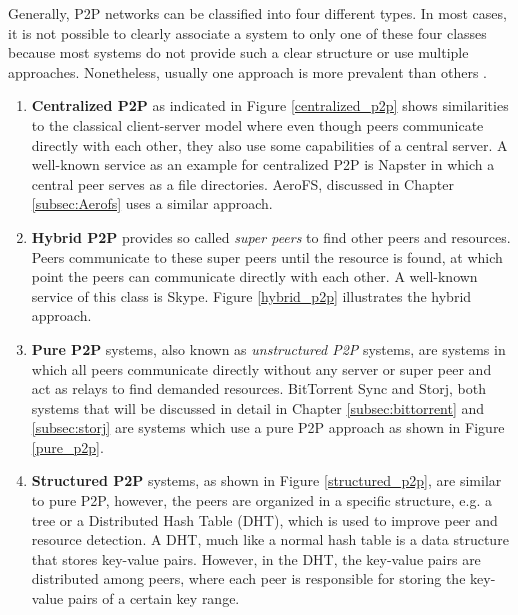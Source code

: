 Generally, P2P networks can be classified into four different types. In most cases, it is not possible to clearly associate a system to only one of these four classes because most systems do not provide such a clear structure or use multiple approaches. Nonetheless, usually one approach is more prevalent than others \cite{openp2p:p2p_introduction}.
\begin{enumerate}
	\item \textbf{Centralized P2P} as indicated in Figure \ref{centralized_p2p} shows similarities to the classical client-server model where even though peers communicate directly with each other, they also use some capabilities of a central server. A well-known service as an example for centralized P2P is Napster in which a central peer serves as a file directories. AeroFS, discussed in Chapter \ref{subsec:Aerofs} uses a similar approach.

	\item \textbf{Hybrid P2P} provides so called \textit{super peers} to find other peers and resources. Peers communicate to these super peers until the resource is found, at which point the peers can communicate directly with each other. A well-known service of this class is Skype. Figure \ref{hybrid_p2p} illustrates the hybrid approach.
	
	\item \textbf{Pure P2P} systems, also known as \textit{unstructured P2P} systems, are systems in which all peers communicate directly without any server or super peer and act as relays to find demanded resources. BitTorrent Sync and Storj, both systems that will be discussed in detail in Chapter \ref{subsec:bittorrent} and \ref{subsec:storj} are systems which use a pure P2P approach as shown in Figure \ref{pure_p2p}.
	
	\item \textbf{Structured P2P} systems, as shown in Figure \ref{structured_p2p}, are similar to pure P2P, however, the peers are organized in a specific structure, e.g. a tree or a Distributed Hash Table (DHT), which is used to improve peer and resource detection. A DHT, much like a normal hash table is a data structure that stores key-value pairs. However, in the DHT, the key-value pairs are distributed among peers, where each peer is responsible for storing the key-value pairs of a certain key range.
\end{enumerate}

